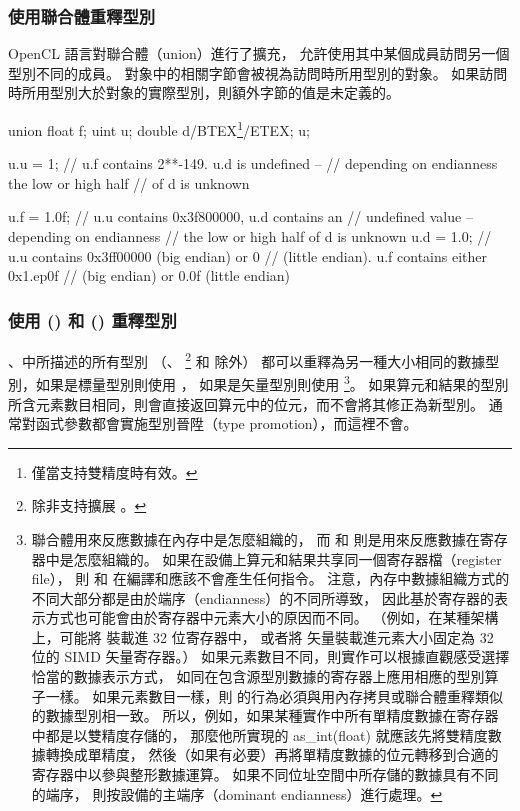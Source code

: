 \subsubsection{使用聯合體重釋型別}

OpenCL 語言對聯合體（union）進行了擴充，
允許使用其中某個成員訪問另一個型別不同的成員。
對象中的相關字節會被視為訪問時所用型別的對象。
如果訪問時所用型別大於對象的實際型別，則額外字節的值是未定義的。

\startexample
\startclc
union{ float f; uint u; double d/BTEX\footnote{僅當支持雙精度時有效。}/ETEX;} u;

u.u = 1;	// u.f contains 2**-149. u.d is undefined --
		// depending on endianness the low or high half
		// of d is unknown

u.f = 1.0f;	// u.u contains 0x3f800000, u.d contains an
		// undefined value -- depending on endianness
		// the low or high half of d is unknown
u.d = 1.0;	// u.u contains 0x3ff00000 (big endian) or 0
		// (little endian). u.f contains either 0x1.ep0f
		// (big endian) or 0.0f (little endian)
\stopclc
\stopexample

\subsubsection{使用 () 和 () 重釋型別}

、中所描述的所有型別
（、 
\footnote{除非支持擴展 。} 和  除外）
都可以重釋為另一種大小相同的數據型別，如果是標量型別則使用 ，
如果是矢量型別則使用 \footnote{
聯合體用來反應數據在內存中是怎麼組織的，
而  和  則是用來反應數據在寄存器中是怎麼組織的。
如果在設備上算元和結果共享同一個寄存器檔（register file），
則  和  在編譯和應該不會產生任何指令。
注意，內存中數據組織方式的不同大部分都是由於端序（endianness）的不同所導致，
因此基於寄存器的表示方式也可能會由於寄存器中元素大小的原因而不同。
（例如，在某種架構上，可能將  裝載進 32 位寄存器中，
或者將  矢量裝載進元素大小固定為 32 位的 SIMD 矢量寄存器。）
如果元素數目不同，則實作可以根據直觀感受選擇恰當的數據表示方式，
如同在包含源型別數據的寄存器上應用相應的型別算子一樣。
如果元素數目一樣，則  的行為必須與用內存拷貝或聯合體重釋類似的數據型別相一致。
所以，例如，如果某種實作中所有單精度數據在寄存器中都是以雙精度存儲的，
那麼他所實現的 as_int(float) 就應該先將雙精度數據轉換成單精度，
然後（如果有必要）再將單精度數據的位元轉移到合適的寄存器中以參與整形數據運算。
如果不同位址空間中所存儲的數據具有不同的端序，
則按設備的主端序（dominant endianness）進行處理。
}。
如果算元和結果的型別所含元素數目相同，則會直接返回算元中的位元，而不會將其修正為新型別。
通常對函式參數都會實施型別晉陞（type promotion），而這裡不會。

